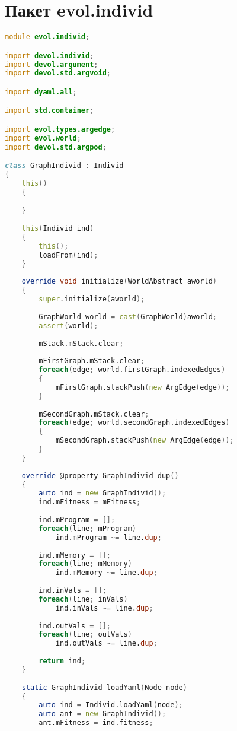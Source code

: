 \documentclass[russian,utf8,emptystyle]{eskdtext}
\begin{document}
\section{Пакет evol.individ}
\begin{lstlisting}[language=D]
module evol.individ;

import devol.individ;
import devol.argument;
import devol.std.argvoid;

import dyaml.all;

import std.container;

import evol.types.argedge;
import evol.world;
import devol.std.argpod;

class GraphIndivid : Individ
{
    this()
    {

    }
    
    this(Individ ind)
    {
        this();
        loadFrom(ind);
    }
    
    override void initialize(WorldAbstract aworld) 
    {
        super.initialize(aworld);
        
        GraphWorld world = cast(GraphWorld)aworld;
        assert(world);
         
        mStack.mStack.clear;
        
        mFirstGraph.mStack.clear;
        foreach(edge; world.firstGraph.indexedEdges)
        {
            mFirstGraph.stackPush(new ArgEdge(edge));
        }
        
        mSecondGraph.mStack.clear;
        foreach(edge; world.secondGraph.indexedEdges)
        {
            mSecondGraph.stackPush(new ArgEdge(edge));
        }
    }
    
    override @property GraphIndivid dup()
    {
        auto ind = new GraphIndivid();
        ind.mFitness = mFitness;
        
        ind.mProgram = [];
        foreach(line; mProgram)
            ind.mProgram ~= line.dup;
            
        ind.mMemory = [];
        foreach(line; mMemory)
            ind.mMemory ~= line.dup;
            
        ind.inVals = [];    
        foreach(line; inVals)
            ind.inVals ~= line.dup;
            
        ind.outVals = [];     
        foreach(line; outVals)
            ind.outVals ~= line.dup;    
            
        return ind;
    } 
    
    static GraphIndivid loadYaml(Node node)
    {
        auto ind = Individ.loadYaml(node);
        auto ant = new GraphIndivid();
        ant.mFitness = ind.fitness;
        

\end{lstlisting}
\end{document}
